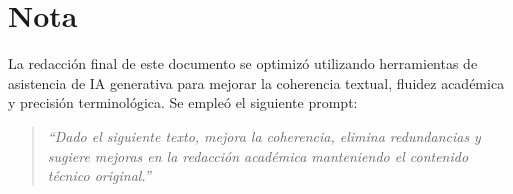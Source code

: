 \documentclass[dosguias,openany]{tesisusach}
\begin{document}
	\mainmatter
	
	
	
	
	
	
	
	
	\printbibliography[heading=bibintoc]
	

	\printglossary[title=Glosario,toctitle=Glosario]

	\appendix
	
	
	
	
	

	\annex

	\newpage
    \chapter*{Nota}
    La redacción final de este documento se optimizó utilizando herramientas de asistencia de IA generativa para mejorar la coherencia textual, fluidez académica y precisión terminológica. Se empleó el siguiente prompt:

    \begin{quote}
    \textit{``Dado el siguiente texto, mejora la coherencia, elimina redundancias y sugiere mejoras en la redacción académica manteniendo el contenido técnico original.''}
    \end{quote}
	
\end{document}
